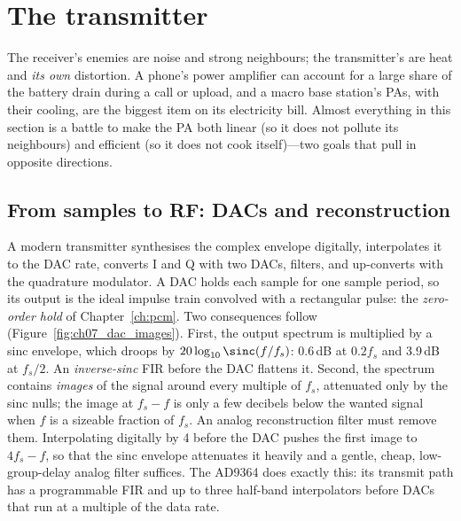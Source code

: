 
\section{The transmitter}
\label{sec:ch07:tx}

The receiver's enemies are noise and strong neighbours; the transmitter's are heat and
\emph{its own} distortion. A phone's power amplifier can account for a large share of the battery
drain during a call or upload, and a macro base station's PAs, with their cooling, are the biggest
item on its electricity bill. Almost everything in this section is a battle to make the PA both linear
(so it does not pollute its neighbours) and efficient (so it does not cook itself)---two goals that
pull in opposite directions.

\subsection{From samples to RF: DACs and reconstruction}

A modern transmitter synthesises the complex envelope digitally, interpolates it to the DAC rate,
converts I and Q with two DACs, filters, and up-converts with the quadrature modulator. A DAC holds each
sample for one sample period, so its output is the ideal impulse train convolved with a rectangular
pulse: the \emph{zero-order hold} of Chapter~\ref{ch:pcm}. Two consequences follow
(Figure~\ref{fig:ch07_dac_images}). First, the output spectrum is multiplied by a sinc envelope, which
droops by $20\log_{10}\sinc(f/f_s)$: 0.6\,dB at $0.2f_s$ and 3.9\,dB at $f_s/2$. An \emph{inverse-sinc}
FIR before the DAC flattens it. Second, the spectrum contains \emph{images} of the signal around every
multiple of $f_s$, attenuated only by the sinc nulls; the image at $f_s-f$ is only a few decibels below the
wanted signal when $f$ is a sizeable fraction of $f_s$. An analog reconstruction filter must remove them.
Interpolating digitally by 4 before the DAC pushes the first image to $4f_s-f$, so that the sinc envelope
attenuates it heavily and a gentle, cheap, low-group-delay analog filter suffices. The AD9364 does
exactly this: its transmit path has a programmable FIR and up to three half-band interpolators before
DACs that run at a multiple of the data rate.

